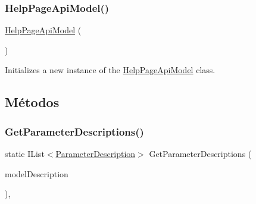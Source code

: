 \subsubsection{\texorpdfstring{Help\+Page\+Api\+Model()}{HelpPageApiModel()}}
{\footnotesize\ttfamily \hyperlink{classApi3Layers_1_1Areas_1_1HelpPage_1_1Models_1_1HelpPageApiModel}{Help\+Page\+Api\+Model} (\begin{DoxyParamCaption}{ }\end{DoxyParamCaption})}



Initializes a new instance of the \hyperlink{classApi3Layers_1_1Areas_1_1HelpPage_1_1Models_1_1HelpPageApiModel}{Help\+Page\+Api\+Model} class. 



\subsection{Métodos}
\mbox{\label{classApi3Layers_1_1Areas_1_1HelpPage_1_1Models_1_1HelpPageApiModel_a46f28b264ed67e8b868762020f049126}} 
\subsubsection{\texorpdfstring{Get\+Parameter\+Descriptions()}{GetParameterDescriptions()}}
{\footnotesize\ttfamily static I\+List$<$\hyperlink{classApi3Layers_1_1Areas_1_1HelpPage_1_1ModelDescriptions_1_1ParameterDescription}{Parameter\+Description}$>$ Get\+Parameter\+Descriptions (\begin{DoxyParamCaption}\item[{\hyperlink{classApi3Layers_1_1Areas_1_1HelpPage_1_1ModelDescriptions_1_1ModelDescription}{Model\+Description}}]{model\+Description }\end{DoxyParamCaption})\hspace{0.3cm}{\ttfamily [static]}, {\ttfamily [private]}}




